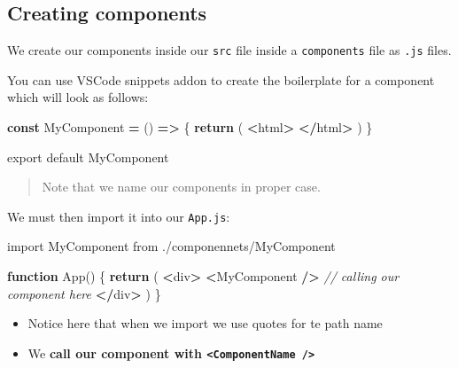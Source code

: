 \documentclass[
]{report}
\newenvironment{Shaded}{\begin{snugshade}}{\end{snugshade}}
\newcommand{\CommentTok}[1]{\textcolor[rgb]{0.56,0.35,0.01}{\textit{#1}}}
\newcommand{\ControlFlowTok}[1]{\textcolor[rgb]{0.13,0.29,0.53}{\textbf{#1}}}
\newcommand{\FunctionTok}[1]{\textcolor[rgb]{0.00,0.00,0.00}{#1}}
\newcommand{\ImportTok}[1]{#1}
\newcommand{\KeywordTok}[1]{\textcolor[rgb]{0.13,0.29,0.53}{\textbf{#1}}}
\newcommand{\NormalTok}[1]{#1}
\newcommand{\OperatorTok}[1]{\textcolor[rgb]{0.81,0.36,0.00}{\textbf{#1}}}
\newcommand{\StringTok}[1]{\textcolor[rgb]{0.31,0.60,0.02}{#1}}
\providecommand{\tightlist}{%
  \setlength{\itemsep}{0pt}\setlength{\parskip}{0pt}}
\theoremstyle{definition}
\theoremstyle{definition}
\theoremstyle{definition}
\theoremstyle{definition}
\theoremstyle{remark}
\begin{document}
\hypertarget{creating-components}{%
\subsection{Creating components}\label{creating-components}}

We create our components inside our \texttt{src} file inside a \texttt{components} file as \texttt{.js} files.

You can use VSCode snippets addon to create the boilerplate for a component which will look as follows:

\begin{Shaded}
\begin{Highlighting}[]
\KeywordTok{const}\NormalTok{ MyComponent }\OperatorTok{=}\NormalTok{ () }\KeywordTok{=\textgreater{}}\NormalTok{ \{}
    \ControlFlowTok{return}\NormalTok{ (}
        \OperatorTok{\textless{}}\NormalTok{html}\OperatorTok{\textgreater{}}
        \OperatorTok{\textless{}/}\NormalTok{html}\OperatorTok{\textgreater{}} 
\NormalTok{    )}
\NormalTok{\}}

\ImportTok{export} \ImportTok{default}\NormalTok{ MyComponent}
\end{Highlighting}
\end{Shaded}

\begin{quote}
Note that we name our components in proper case.
\end{quote}

We must then import it into our \texttt{App.js}:

\begin{Shaded}
\begin{Highlighting}[]
\ImportTok{import}\NormalTok{ MyComponent }\ImportTok{from} \StringTok{\textquotesingle{}./componennets/MyComponent\textquotesingle{}}

\KeywordTok{function} \FunctionTok{App}\NormalTok{() \{}
    \ControlFlowTok{return}\NormalTok{ (}
        \OperatorTok{\textless{}}\NormalTok{div}\OperatorTok{\textgreater{}}
            \OperatorTok{\textless{}}\NormalTok{MyComponent }\OperatorTok{/\textgreater{}} \CommentTok{// calling our component here}
        \OperatorTok{\textless{}/}\NormalTok{div}\OperatorTok{\textgreater{}}
\NormalTok{    )}
\NormalTok{\}}
\end{Highlighting}
\end{Shaded}

\begin{itemize}
\tightlist
\item
  Notice here that when we import we use quotes for te path name
\item
  We \textbf{call our component with \texttt{\textless{}ComponentName\ /\textgreater{}}}
\end{itemize}
\end{document}
